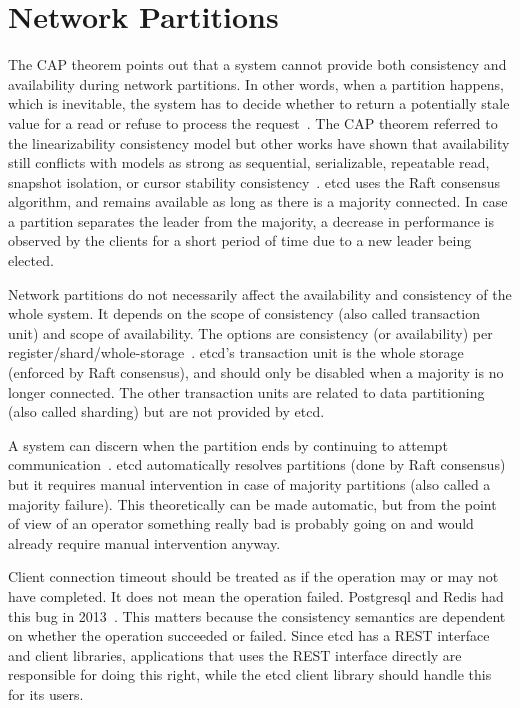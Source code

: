 \documentclass[12pt,conference]{IEEEtran}
\begin{document}
\section{Network Partitions}

The CAP theorem points out that a system cannot provide both consistency and availability during network partitions. In other words, when a partition happens, which is inevitable, the system has to decide whether to return a potentially stale value for a read or refuse to process the request~\cite{brewer2012cap}. The CAP theorem referred to the linearizability consistency model but other works have shown that availability still conflicts with models as strong as sequential, serializable, repeatable read, snapshot isolation, or cursor stability consistency~\cite{strongConsistencyWebsite,bailis2013hat}. etcd uses the Raft consensus algorithm, and remains available as long as there is a majority connected. In case a partition separates the leader from the majority, a decrease in performance is observed by the clients for a short period of time due to a new leader being elected.

Network partitions do not necessarily affect the availability and consistency of the whole system. It depends on the scope of consistency (also called transaction unit) and scope of availability. The options are consistency (or availability) per register/shard/whole-storage~\cite{brewer2012cap}. etcd's transaction unit is the whole storage (enforced by Raft consensus), and should only be disabled when a majority is no longer connected. The other transaction units are related to data partitioning (also called sharding) but are not provided by etcd.

A system can discern when the partition ends by continuing to attempt communication~\cite{brewer2012cap}. etcd automatically resolves partitions (done by Raft consensus) but it requires manual intervention in case of majority partitions (also called a majority failure). This theoretically can be made automatic, but from the point of view of an operator something really bad is probably going on and would already require manual intervention anyway.

Client connection timeout should be treated as if the operation may or may not have completed. It does not mean the operation failed. Postgresql and Redis had this bug in 2013~\cite{postgresJepsenPostWebsite}. This matters because the consistency semantics are dependent on whether the operation succeeded or failed. Since etcd has a REST interface and client libraries, applications that uses the REST interface directly are responsible for doing this right, while the etcd client library should handle this for its users.
\end{document}
